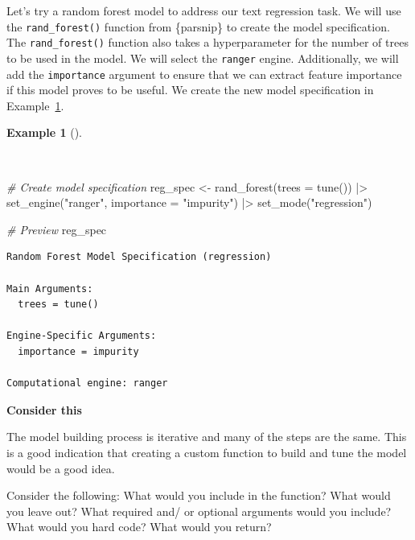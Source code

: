 \documentclass[
  letterpaper,
  krantz1]{latex/krantz-mod}
\newenvironment{Shaded}{\begin{snugshade}}{\end{snugshade}}
\newcommand{\AttributeTok}[1]{\textcolor[rgb]{0.00,0.00,0.00}{#1}}
\newcommand{\CommentTok}[1]{\textcolor[rgb]{0.00,0.00,0.00}{\textit{#1}}}
\newcommand{\FunctionTok}[1]{\textcolor[rgb]{0.00,0.00,0.00}{#1}}
\newcommand{\NormalTok}[1]{\textcolor[rgb]{0.00,0.00,0.00}{#1}}
\newcommand{\OtherTok}[1]{\textcolor[rgb]{0.00,0.00,0.00}{#1}}
\newcommand{\SpecialCharTok}[1]{\textcolor[rgb]{0.00,0.00,0.00}{#1}}
\newcommand{\StringTok}[1]{\textcolor[rgb]{0.00,0.00,0.00}{#1}}
\theoremstyle{definition}
\newtheorem{example}{Example}[chapter]
\theoremstyle{definition}
\theoremstyle{remark}
\begin{document}
Let's try a random forest model to address our text regression task. We
will use the \texttt{rand\_forest()} function from \{parsnip\} to create
the model specification. The \texttt{rand\_forest()} function also takes
a hyperparameter for the number of trees to be used in the model. We
will select the \texttt{ranger} engine. Additionally, we will add the
\texttt{importance} argument to ensure that we can extract feature
importance if this model proves to be useful. We create the new model
specification in Example~\ref{exm-predict-reg-model-spec-random-forest}.

\begin{example}[]\protect\hypertarget{exm-predict-reg-model-spec-random-forest}{}\label{exm-predict-reg-model-spec-random-forest}

~

\begin{Shaded}
\begin{Highlighting}[numbers=left,,]
\CommentTok{\# Create model specification}
\NormalTok{reg\_spec }\OtherTok{\textless{}{-}}
  \FunctionTok{rand\_forest}\NormalTok{(}\AttributeTok{trees =} \FunctionTok{tune}\NormalTok{()) }\SpecialCharTok{|\textgreater{}}
  \FunctionTok{set\_engine}\NormalTok{(}\StringTok{"ranger"}\NormalTok{, }\AttributeTok{importance =} \StringTok{"impurity"}\NormalTok{) }\SpecialCharTok{|\textgreater{}}
  \FunctionTok{set\_mode}\NormalTok{(}\StringTok{"regression"}\NormalTok{)}

\CommentTok{\# Preview}
\NormalTok{reg\_spec}
\end{Highlighting}
\end{Shaded}

\begin{verbatim}
Random Forest Model Specification (regression)

Main Arguments:
  trees = tune()

Engine-Specific Arguments:
  importance = impurity

Computational engine: ranger
\end{verbatim}

\end{example}

\begin{tcolorbox}[enhanced jigsaw, leftrule=.75mm, colframe=quarto-callout-color-frame, left=2mm, colback=white, toprule=.15mm, breakable, arc=.35mm, opacityback=0, bottomrule=.15mm, rightrule=.15mm]

\textbf{ Consider this}

The model building process is iterative and many of the steps are the
same. This is a good indication that creating a custom function to build
and tune the model would be a good idea.

Consider the following: What would you include in the function? What
would you leave out? What required and/ or optional arguments would you
include? What would you hard code? What would you return?

\end{tcolorbox}
\end{document}
